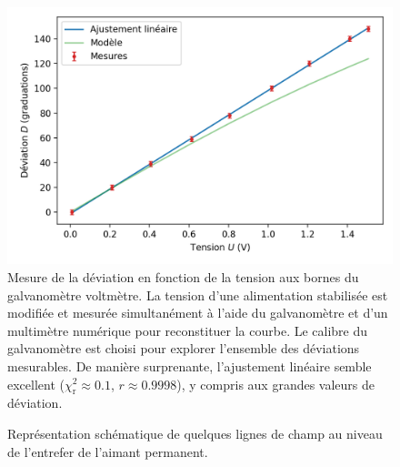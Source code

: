 \documentclass[12pt,a4paper,fleqn]{article}
\begin{document}
\begin{figure}
    \center
    \includegraphics[scale=1]{images/galva_lin.png}
    \caption{Mesure de la déviation en fonction de la tension aux bornes du galvanomètre voltmètre.
    La tension d'une alimentation stabilisée est modifiée et mesurée simultanément à l'aide du galvanomètre et d'un multimètre numérique pour reconstituer la courbe.
    Le calibre du galvanomètre est choisi pour explorer l'ensemble des déviations mesurables.
    De manière surprenante, l'ajustement linéaire semble excellent ($\chi^2_\mathrm{r} \approx \num{0.1}$, $r\approx\num{0.9998}$), y compris aux \og grandes \fg{} valeurs de déviation.
}
    \label{fig:galva_lin}
\end{figure}

\begin{figure}[htbp]
    \center
    \caption{Représentation schématique de quelques lignes de champ au niveau de l'entrefer de l'aimant permanent.}
    \label{fig:entrefer}
\end{figure}
\end{document}
